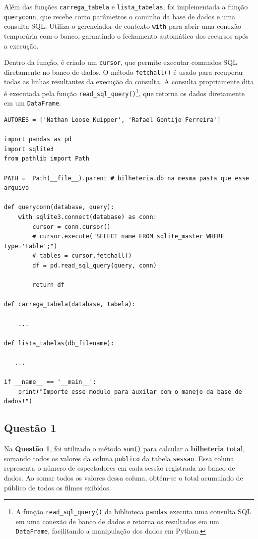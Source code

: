 \documentclass{article}
\begin{document}
Além das funções \texttt{carrega\_tabela} e \texttt{lista\_tabelas}, foi implementada a função \texttt{queryconn}, que recebe como parâmetros o caminho da base de dados e uma consulta SQL. Utiliza o gerenciador de contexto \texttt{with} para abrir uma conexão temporária com o banco, garantindo o fechamento automático dos recursos após a execução.

Dentro da função, é criado um \texttt{cursor}, que permite executar comandos SQL diretamente no banco de dados. O método \texttt{fetchall()} é usado para recuperar todas as linhas resultantes da execução da consulta. A consulta propriamente dita é executada pela função \texttt{read\_sql\_query()}\footnote{A função \texttt{read\_sql\_query()} da biblioteca \texttt{pandas} executa uma consulta SQL em uma conexão de banco de dados e retorna os resultados em um \texttt{DataFrame}, facilitando a manipulação dos dados em Python.}, que retorna os dados diretamente em um \texttt{DataFrame}.~\cite{sqlite3_docs}


\linespread{1}
\begin{lstlisting}
AUTORES = ['Nathan Loose Kuipper', 'Rafael Gontijo Ferreira']

import pandas as pd 
import sqlite3
from pathlib import Path

PATH =  Path(__file__).parent # bilheteria.db na mesma pasta que esse arquivo

def queryconn(database, query):    
    with sqlite3.connect(database) as conn:
        cursor = conn.cursor()
        # cursor.execute("SELECT name FROM sqlite_master WHERE type='table';")
        # tables = cursor.fetchall() 
        df = pd.read_sql_query(query, conn)

        return df
    
def carrega_tabela(database, tabela):

    ...

def lista_tabelas(db_filename):

   ...
    
if __name__ == '__main__':
    print("Importe esse modulo para auxilar com o manejo da base de dados!")
\end{lstlisting}
\pagebreak
\linespread{1.5}
\subsection*{Questão 1}
Na \textbf{Questão 1}, foi utilizado o método \texttt{sum()} para calcular a \textbf{bilheteria total}, somando todos os valores da coluna \texttt{publico} da tabela \texttt{sessao}. Essa coluna representa o número de espectadores em cada sessão registrada no banco de dados. Ao somar todos os valores dessa coluna, obtém-se o total acumulado de público de todos os filmes exibidos.
\end{document}
